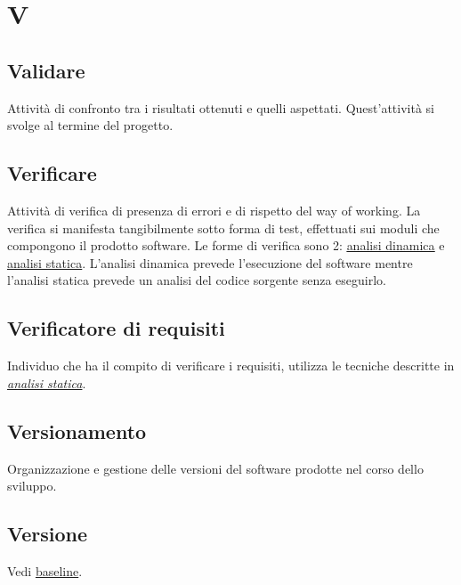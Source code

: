 	\section{V}
	
	\subsection{Validare}
	\label{sec:validare}
	Attività di confronto tra i risultati ottenuti e quelli aspettati. Quest'attività si svolge al termine del progetto.
	
	\subsection{Verificare}
	\label{sec:verificare}
	Attività di verifica di presenza di errori e di rispetto del way of working. La verifica si manifesta tangibilmente sotto forma di test, effettuati sui moduli che compongono il prodotto software. Le forme di verifica sono 2: \hyperref[sec:analisidinamica]{\underline{analisi dinamica}} e \hyperref[sec:analisistatica]{\underline{analisi statica}}. L'analisi dinamica prevede l'esecuzione del software mentre l'analisi statica prevede un analisi del codice sorgente senza eseguirlo. 
	
	\subsection{Verificatore di requisiti}
	\label{sec:verificatorerequisiti}
	Individuo che ha il compito di verificare i requisiti, utilizza le tecniche descritte in \emph{\hyperref[sec:analisistatica]{analisi statica}}.
	
	\subsection{Versionamento}
	\label{sec:versionamento}
	Organizzazione e gestione delle versioni del software prodotte nel corso dello sviluppo.

	\subsection{Versione}
	\label{sec:versione}
	Vedi \hyperref[sec:baseline]{baseline}. \newpage

